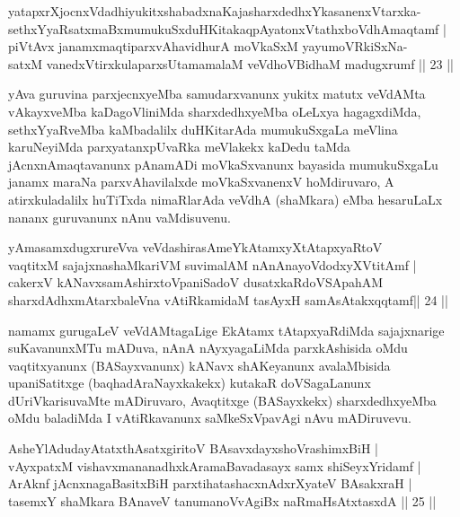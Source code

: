 \begin{shl}
yatapxrXjocnxVdadhiyukitxshabadxnaKajasharxdedhxYkasanenxVtarxka-\\
sethxYyaRsatxmaBxmumukuSxduHKitakaqpAyatonxVtathxboVdhAmaqtamf | \\
piVtAvx janamxmaqtiparxvAhavidhurA moVkaSxM yayumoVRkiSxNa-\\
satxM vanedxV\s tirxkulaparxsUtamamalaM veVdhoVBidhaM madugxrumf \hfill||  23 ||  
\end{shl}

\begin{artha}
yAva guruvina parxjecnxyeMba samudarxvanunx yukitx matutx veVdAMta 
vAkayxveMba kaDagoVliniMda sharxdedhxyeMba oLeLxya hagagxdiMda, 
sethxYyaRveMba kaMbadalilx duHKitarAda mumukuSxgaLa meVlina 
karuNeyiMda parxyatanxpUvaRka meVlakekx kaDedu taMda 
jAcnxnAmaqtavanunx pAnamADi moVkaSxvanunx bayasida mumukuSxgaLu janamx 
maraNa parxvAhavilalxde moVkaSxvanenxV hoMdiruvaro, A atirxkuladalilx 
huTiTxda nimaRlarAda veVdhA (shaMkara) eMba hesaruLaLx nananx 
guruvanunx nAnu vaMdisuvenu.
\end{artha}

\begin{shl}
yAmasamxdugxrureVva veVdashirasAmeYkAtamxyXtAtapxyaRtoV \\
vaqtitxM sajajxnashaMkariVM suvimalAM nAnAnayoVdodxyXVtitAmf | \\
cakerxV kANavxsamAshirxtoVpaniSadoV dusatxkaRdoVSApahAM \\
sharxdAdhxmAtarxbaleVna vAtiRkamidaM tasAyxH samAsAtakxqqtamf\hfill ||  24 ||  
\end{shl}

\begin{artha}
namamx gurugaLeV veVdAMtagaLige EkAtamx tAtapxyaRdiMda sajajxnarige 
suKa\-vanunxMTu mADuva, nAnA nAyxyagaLiMda parxkAshisida oMdu 
vaqtitxyanunx (BASayxvanunx) kANavx shAKeyanunx avalaMbisida 
upaniSatitxge (baqhadAraNayxkakekx) kutakaR doVSagaLanunx 
dUriVkarisuvaMte mADiruvaro, Avaqtitxge (BASayxkekx) sharxdedhxyeMba 
oMdu baladiMda I vAtiRkavanunx saMkeSxVpavAgi nAvu mADiruvevu.
\end{artha}

\begin{shl}
AsheYlAdudayAtatxthAsatxgiritoV BAsavxdayxshoVrashimxBiH |\\
vAyxpatxM vishavxmananadhxkAramaBavadasayx samx shiSeyxYridamf |\\
ArAknf jAcnxnagaBasitxBiH parxtihatashacxnAdxrXyateV BAsakxraH |\\
tasemxY shaMkara BAnaveV tanumanoVvAgiBx naRmaHsAtxtasxdA \hfill|| 25 ||
\end{shl}

